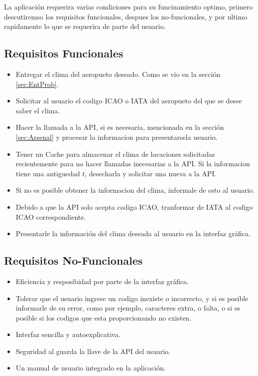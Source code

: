 La aplicación requerira varias condiciones para su funcinamiento optimo, primero descutiremso los requisitos funcionales, despues
los no-funcionales, y por ultimo rapidamente lo que se requerira de parte del usuario.

\subsection{Requisitos Funcionales}
\begin{itemize}
    \item Entregar el clima del aeropueto deseado. Como se vio en la sección \ref{sec:EntProb}.
    \item Solicitar al usuario el codigo ICAO o IATA del aeropueto del que se desee saber el clima.
    \item Hacer la llamada a la API, si es necesaria, mencionada en la sección \ref{sec:Arsenal} y procesar la informacion para presentarsela
    usuario.
    \item Tener un Cache para almacenar el clima de locaciones solicitadas recientemente para no hacer llamadas inecesarias a la API. Si
    la informacion tiene una antiguedad $t$, desecharla y solicitar una nueva a la API. 
    \item  Si no es posible obtener la informacion del clima, informale de esto al usuario.
    \item Debido a que la API solo acepta codigo ICAO, tranformar de IATA al codigo ICAO correspondiente.
    \item Presentarle la información del clima deseada al usuario en la interfaz gráfica.
\end{itemize}

\subsection{Requisitos No-Funcionales}
\begin{itemize}
    \item Eficiencia y resposibidad por parte de la interfaz gráfica.
    \item Tolerar que el usuario ingrese un codigo inexiste o incorrecto, y si es posible informarle de su error, como por ejemplo,
    caracteres extra, o falta, o si es posible si los codigos que esta proporcionando no existen.
    \item Interfaz sencilla y autoexplicativa.
    \item Seguridad al guarda la llave de la API del usuario.
    \item Un manual de usuario integrado en la aplicación.
\end{itemize}

